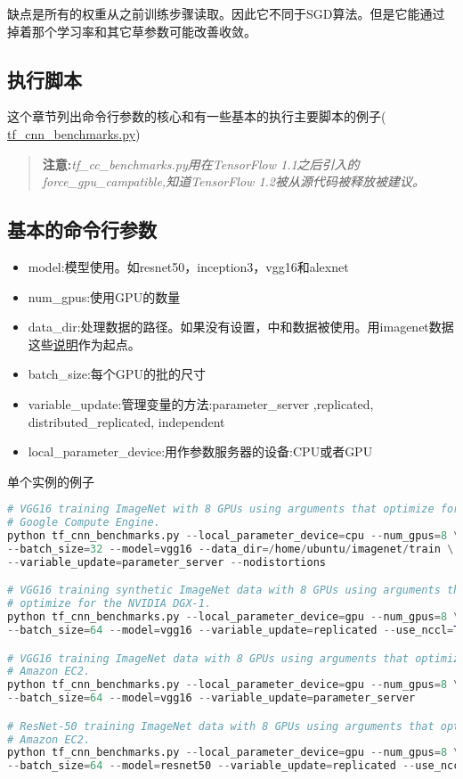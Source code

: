缺点是所有的权重从之前训练步骤读取。因此它不同于SGD算法。但是它能通过掉着那个学习率和其它草参数可能改善收敛。

\subsection{执行脚本}
这个章节列出命令行参数的核心和有一些基本的执行主要脚本的例子( \href{https://github.com/tensorflow/benchmarks/tree/master/scripts/tf_cnn_benchmarks/tf_cnn_benchmarks.py}{tf\_cnn\_benchmarks.py})
\begin{quote}
	\textbf{注意:}\emph{tf\_cc\_benchmarks.py用在TensorFlow 1.1之后引入的force\_gpu\_campatible,知道TensorFlow 1.2被从源代码被释放被建议。}
\end{quote}
\subsection{基本的命令行参数}
\begin{itemize}
	\item model:模型使用。如resnet50，inception3，vgg16和alexnet
	\item num\_gpus:使用GPU的数量
	\item data\_dir:处理数据的路径。如果没有设置，中和数据被使用。用imagenet数据这些\href{https://github.com/tensorflow/models/tree/master/inception#getting-started}{说明}作为起点。
	\item batch\_size:每个GPU的批的尺寸
	\item variable\_update:管理变量的方法:parameter\_server ,replicated, distributed\_replicated, independent
	\item local\_parameter\_device:用作参数服务器的设备:CPU或者GPU
\end{itemize}
单个实例的例子
\begin{lstlisting}[language=Python]
# VGG16 training ImageNet with 8 GPUs using arguments that optimize for
# Google Compute Engine.
python tf_cnn_benchmarks.py --local_parameter_device=cpu --num_gpus=8 \
--batch_size=32 --model=vgg16 --data_dir=/home/ubuntu/imagenet/train \
--variable_update=parameter_server --nodistortions

# VGG16 training synthetic ImageNet data with 8 GPUs using arguments that
# optimize for the NVIDIA DGX-1.
python tf_cnn_benchmarks.py --local_parameter_device=gpu --num_gpus=8 \
--batch_size=64 --model=vgg16 --variable_update=replicated --use_nccl=True

# VGG16 training ImageNet data with 8 GPUs using arguments that optimize for
# Amazon EC2.
python tf_cnn_benchmarks.py --local_parameter_device=gpu --num_gpus=8 \
--batch_size=64 --model=vgg16 --variable_update=parameter_server

# ResNet-50 training ImageNet data with 8 GPUs using arguments that optimize for
# Amazon EC2.
python tf_cnn_benchmarks.py --local_parameter_device=gpu --num_gpus=8 \
--batch_size=64 --model=resnet50 --variable_update=replicated --use_nccl=False
\end{lstlisting}
